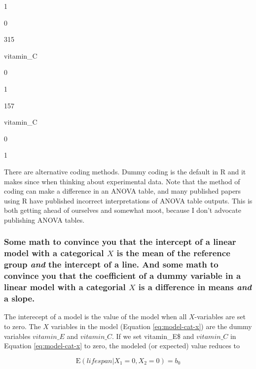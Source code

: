 \documentclass[]{book}
\begin{document}
1

0

315

vitamin\_C

0

1

157

vitamin\_C

0

1

There are alternative coding methods. Dummy coding is the default in R
and it makes since when thinking about experimental data. Note that the
method of coding can make a difference in an ANOVA table, and many
published papers using R have published incorrect interpretations of
ANOVA table outputs. This is both getting ahead of ourselves and
somewhat moot, because I don't advocate publishing ANOVA tables.

\subsubsection{\texorpdfstring{Some math to convince you that the
intercept of a linear model with a categorical \(X\) is the mean of the
reference group \emph{and} the intercept of a line. And some math to
convince you that the coefficient of a dummy variable in a linear model
with a categorial \(X\) is a difference in means \emph{and} a
slope.}{Some math to convince you that the intercept of a linear model with a categorical X is the mean of the reference group and the intercept of a line. And some math to convince you that the coefficient of a dummy variable in a linear model with a categorial X is a difference in means and a slope.}}\label{some-math-to-convince-you-that-the-intercept-of-a-linear-model-with-a-categorical-x-is-the-mean-of-the-reference-group-and-the-intercept-of-a-line.-and-some-math-to-convince-you-that-the-coefficient-of-a-dummy-variable-in-a-linear-model-with-a-categorial-x-is-a-difference-in-means-and-a-slope.}

The interecept of a model is the value of the model when all
\(X\)-variables are set to zero. The \(X\) variables in the model
(Equation \eqref{eq:model-cat-x}) are the dummy variables \(vitamin\_E\)
and \(vitamin\_C\). If we set vitamin\_E\$ and \(vitamin\_C\) in
Equation \eqref{eq:model-cat-x} to zero, the modeled (or expected) value
reduces to

\begin{equation}
\mathrm{E}(lifespan|X_1=0, X_2=0) = b_0
\end{equation}
\end{document}

